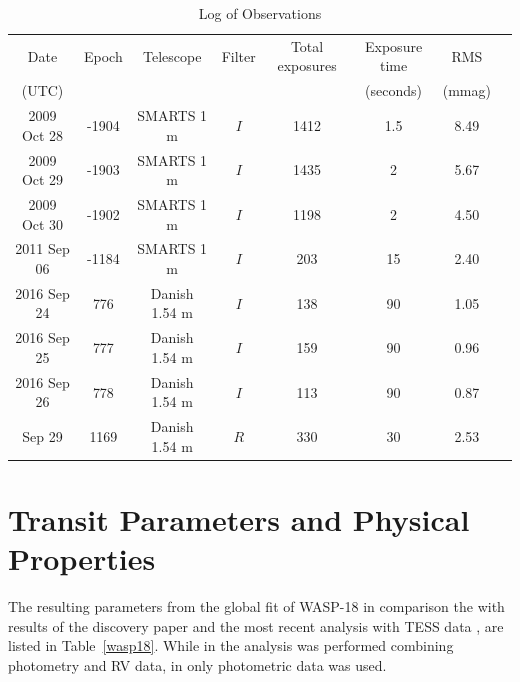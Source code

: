 \begin{table}
\caption{Log of Observations}             
\label{log_table}      
\centering          
\begin{tabular}{cccccccc}
\hline\hline       
 Date & Epoch\footnotemark{a} & Telescope & Filter & Total exposures & Exposure time\footnotemark{b} & RMS\footnotemark{c} \\
 (UTC) &       &           &       &                   & (seconds) & (mmag)\\
\hline  
 2009 Oct 28 &-1904 & SMARTS 1 m & $I$ & 1412 & 1.5 & 8.49  \\
 2009 Oct 29 & -1903 & SMARTS 1 m & $I$ & 1435 & 2 & 5.67 \\
2009 Oct 30 & -1902 & SMARTS 1 m & $I$ & 1198 & 2  & 4.50 \\
 2011 Sep 06 & -1184 & SMARTS 1 m & $I$ & 203 & 15 & 2.40 \\
2016 Sep 24\footnotemark{d} & 776 & Danish 1.54 m & $I$ & 138 & 90 & 1.05  \\
2016 Sep 25\footnotemark{d} & 777 &Danish 1.54 m & $I$ & 159 & 90  & 0.96  \\
2016 Sep 26\footnotemark{d} & 778 & Danish 1.54 m & $I$ & 113 & 90 & 0.87  \\ \smallskip
2017 Sep 29\footnotemark{d} & 1169 & Danish 1.54 m & $R$ & 330 & 30 & 2.53 \\
\hline                  
\end{tabular}
\end{table}


\section{Transit Parameters and Physical Properties}\label{transitparams}

The resulting parameters from the global fit of WASP-18 in comparison the with results of the discovery paper \cite{Hellier2009} and the most recent analysis with TESS data \citep{Shporer2018}, are listed in Table~\ref{wasp18}. While in \cite{Hellier2009} the analysis was performed combining photometry and RV data, in \cite{Shporer2018} only photometric data was used. 

